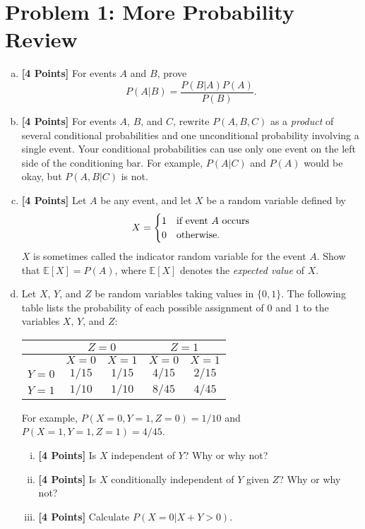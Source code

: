 \documentclass{article}
\newcommand \expect {\mathbb{E}}
\begin{document}
\section*{Problem 1: More Probability Review}

\begin{enumerate}[(a)]
\item {\bf [4 Points]} For events $A$ and $B$, prove
  \[
  P(A|B) = \frac{P(B|A)P(A)}{P(B)}.
  \]

\item {\bf [4 Points]} For events $A$, $B$, and $C$, rewrite
  $P(A,B,C)$ as a \emph{product} of several conditional probabilities
  and one unconditional probability involving a single event. Your
  conditional probabilities can use only one event on the left side of
  the conditioning bar. For example, $P(A|C)$ and $P(A)$ would be
  okay, but $P(A,B|C)$ is not.

\item {\bf [4 Points]} Let $A$ be any event, and let $X$ be a random
  variable defined by
  \[
  X = \begin{cases}
    1 & \hbox{if event $A$ occurs} \\
    0 & \hbox{otherwise}.
  \end{cases}
  \]
  $X$ is sometimes called the indicator random variable for the event
  $A$. Show that $\expect[X] = P(A)$, where $\expect[X]$ denotes the
  {\em expected value} of $X$.

\item Let $X$, $Y$, and $Z$ be random variables taking values in
  $\{0,1\}$. The following table lists the probability of each
  possible assignment of $0$ and $1$ to the variables $X$, $Y$, and
  $Z$:
  \begin{center}
    \begin{tabular}{|l|c|c|c|c|}
      \hline
      &\multicolumn{2}{c|}{$Z=0$} & \multicolumn{2}{c|}{$Z=1$}\\\hline
      & $X = 0$ & $X = 1$ & $X = 0$ & $X = 1$\\\hline
      $Y = 0$ & $1/15$ & $1/15$ & $4/15$ & $2/15$ \\
      $Y = 1$ & $1/10$ & $1/10$ & $8/45$ & $4/45$ \\
      \hline
    \end{tabular}
  \end{center}
  For example, $P(X = 0, Y = 1, Z = 0) = 1/10$ and
  $P(X=1,Y=1,Z=1) = 4/45$.

  \begin{enumerate}[(i)]
  \item {\bf [4 Points]} Is $X$ independent of $Y$? Why or why not?
  \item {\bf [4 Points]} Is $X$ conditionally independent of $Y$ given
    $Z$?  Why or why not?
  \item {\bf [4 Points]} Calculate $P(X = 0 | X+Y > 0)$.
  \end{enumerate}

\end{enumerate}
\end{document}
